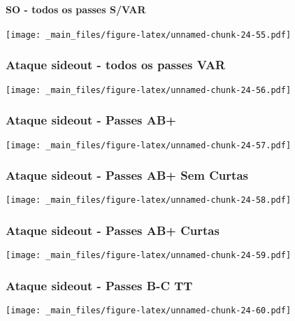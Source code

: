 \documentclass[
]{book}
\begin{document}
\paragraph*{SO - todos os passes S/VAR}\label{so---todos-os-passes-svar-3}

\texttt{[image: \_main\_files/figure-latex/unnamed-chunk-24-55.pdf]}

\subsubsection*{Ataque sideout - todos os passes VAR}\label{ataque-sideout---todos-os-passes-var-3}

\texttt{[image: \_main\_files/figure-latex/unnamed-chunk-24-56.pdf]}

\subsubsection{Ataque sideout - Passes AB+}\label{ataque-sideout---passes-ab-3}

\texttt{[image: \_main\_files/figure-latex/unnamed-chunk-24-57.pdf]}

\subsubsection*{Ataque sideout - Passes AB+ Sem Curtas}\label{ataque-sideout---passes-ab-sem-curtas-3}

\texttt{[image: \_main\_files/figure-latex/unnamed-chunk-24-58.pdf]}

\subsubsection*{Ataque sideout - Passes AB+ Curtas}\label{ataque-sideout---passes-ab-curtas-3}

\texttt{[image: \_main\_files/figure-latex/unnamed-chunk-24-59.pdf]}

\subsubsection{Ataque sideout - Passes B-C TT}\label{ataque-sideout---passes-b-c-tt-3}

\texttt{[image: \_main\_files/figure-latex/unnamed-chunk-24-60.pdf]}
\end{document}
